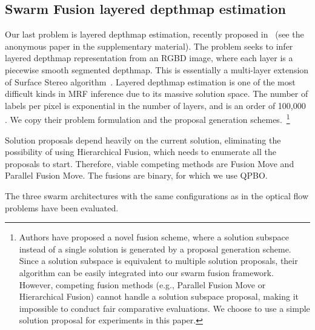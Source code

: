 \subsection{Swarm Fusion layered depthmap estimation}
Our last problem is layered depthmap estimation, recently proposed
in~\cite{layered_depthmap} (see the anonymous paper in the
supplementary material).  The problem seeks to infer layered depthmap
representation from an RGBD image, where each layer is a piecewise
smooth segmented depthmap. This is essentially a multi-layer extension
of Surface Stereo algorithm~\cite{surface_stereo}.
%
Layered depthmap estimation is one of the most difficult kinds in MRF
inference due to its massive solution space. The number of labels per
pixel is exponential in the number of layers, and is an order of 100,000
. We copy their problem
formulation and the proposal generation schemes.~\footnote{Authors have
proposed a novel fusion scheme, where a solution subspace instead of a
single solution is generated by a proposal generation scheme. Since a
solution subspace is equivalent to multiple solution proposals, their
algorithm can be easily integrated into our swarm fusion framework.
However, competing fusion methods (e.g., Parallel Fusion Move or
Hierarchical Fusion) cannot handle a solution subspace proposal, making
it impossible to conduct fair comparative evaluations. We choose to use
a simple solution proposal for experiments in this paper.}


\noindent Solution proposals depend heavily on the current solution,
eliminating the possibility of using Hierarchical Fusion, which needs to
enumerate all the proposals to start. Therefore, viable competing
methods are Fusion Move and Parallel Fusion Move.
%
%
The fusions are binary, for which we use QPBO.




\noindent The three swarm architectures with the same configurations as
in the optical flow problems have been evaluated.
%
